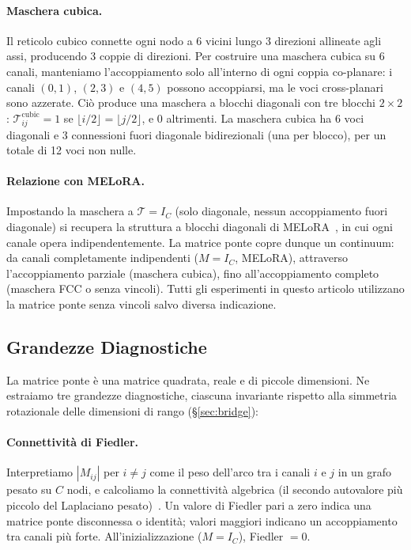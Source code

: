 \documentclass[11pt]{article}
\begin{document}
\paragraph{Maschera cubica.}
Il reticolo cubico connette ogni nodo a 6 vicini lungo 3 direzioni
allineate agli assi, producendo 3 coppie di direzioni.
Per costruire una maschera cubica su 6 canali, manteniamo
l'accoppiamento solo all'interno di ogni coppia co-planare: i canali
$(0,1)$, $(2,3)$ e $(4,5)$ possono accoppiarsi, ma le voci
cross-planari sono azzerate.
Ci\`o produce una maschera a blocchi diagonali con tre blocchi
$2 \times 2$: $\mathcal{T}^\text{cubic}_{ij} = 1$ se
$\lfloor i/2 \rfloor = \lfloor j/2 \rfloor$, e 0 altrimenti.
La maschera cubica ha 6 voci diagonali e 3 connessioni fuori diagonale
bidirezionali (una per blocco), per un totale di 12 voci non nulle.

\paragraph{Relazione con MELoRA.}
Impostando la maschera a $\mathcal{T} = I_C$ (solo diagonale, nessun
accoppiamento fuori diagonale) si recupera la struttura a blocchi
diagonali di MELoRA~\cite{ren2024melora}, in cui ogni canale opera
indipendentemente.
La matrice ponte copre dunque un continuum: da canali completamente
indipendenti ($M = I_C$, MELoRA), attraverso l'accoppiamento parziale
(maschera cubica), fino all'accoppiamento completo (maschera FCC o
senza vincoli).
Tutti gli esperimenti in questo articolo utilizzano la matrice ponte
senza vincoli salvo diversa indicazione.

\subsection{Grandezze Diagnostiche}
\label{sec:diagnostics}

La matrice ponte \`e una matrice quadrata, reale e di piccole
dimensioni.
Ne estraiamo tre grandezze diagnostiche, ciascuna invariante rispetto
alla simmetria rotazionale delle dimensioni di rango
(\S\ref{sec:bridge}):

\paragraph{Connettivit\`a di Fiedler.}
Interpretiamo $|M_{ij}|$ per $i \neq j$ come il peso dell'arco tra i
canali $i$ e $j$ in un grafo pesato su $C$ nodi, e calcoliamo la
connettivit\`a algebrica (il secondo autovalore pi\`u piccolo del
Laplaciano pesato)~\cite{fiedler1973algebraic}.
Un valore di Fiedler pari a zero indica una matrice ponte disconnessa o
identit\`a; valori maggiori indicano un accoppiamento tra canali pi\`u
forte.
All'inizializzazione ($M = I_C$), Fiedler $= 0$.
\end{document}

